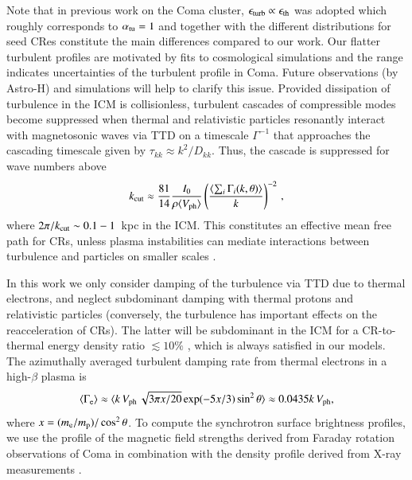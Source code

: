 \documentclass[fleqn,usenatbib,useAMS]{mnras}
\newcommand{\Vph}{V_\mathrm{ph}}
\begin{document}
Note that in previous work on the Coma cluster, $\epsilon_{\mathrm{turb}}
\propto \epsilon_{\mathrm{th}}$ was adopted which roughly corresponds to
$\alpha_{\mathrm{tu}}= 1$ \citep{brunetti12} and together with the
different distributions for seed CRes constitute the main differences
compared to our work. Our flatter turbulent profiles are motivated by
fits to cosmological simulations
\citep{2009ApJ...705.1129L,2010ApJ...725.1452S,2011A&A...529A..17V,2012ApJ...758...74B}
and the range indicates uncertainties of the turbulent profile in
Coma. Future observations (by Astro-H) and simulations will help to
clarify this issue. Provided dissipation of turbulence in the ICM is
collisionless, turbulent cascades of compressible modes become
suppressed when thermal and relativistic particles resonantly interact
with magnetosonic waves via TTD on a timescale $\Gamma^{-1}$ that
approaches the cascading timescale given by $\tau_{kk} \approx
k^2/D_{kk}$. Thus, the cascade is suppressed for wave numbers above
\begin{equation}
\label{eq:kc}
  k_\rmn{cut} \approx \frac{81}{14} \frac{I_0}{\rho \langle \Vph \rangle}
  \left(\frac{\langle\sum_i \Gamma_i(k,\theta)\rangle}{k}\right)^{-2}\,,
\end{equation}
where $2\pi/k_{\mathrm{cut}}\sim 0.1-1$~kpc in the ICM. This constitutes an
effective mean free path for CRs, unless plasma instabilities can
mediate interactions between turbulence and particles on smaller
scales \citep{brunetti11}.

In this work we only consider damping of the turbulence via TTD due to
thermal electrons, and neglect subdominant damping with thermal
protons and relativistic particles (conversely, the turbulence has
important effects on the reacceleration of CRs). The latter will be
subdominant in the ICM for a CR-to-thermal energy density ratio
$\lesssim 10 \%$ \citep{brunetti07}, which is always satisfied in our
models. The azimuthally averaged turbulent damping rate from thermal
electrons \citep{brunetti07} in a high-$\beta$ plasma is
\begin{equation}
\label{eq:Gamma_e}
\langle\Gamma_{\rmn{e}}\rangle \approx \langle k\,\Vph\,\sqrt{3\upi
  x/20}\exp(-5x/3)\sin^2{\theta}\rangle\approx 0.0435k\,\Vph, 
\end{equation}
where $x=(m_{{\mathrm{e}}}/m_{{\mathrm{p}}})/\cos^2{\theta}$. To compute the
synchrotron surface brightness profiles, we use the profile of the
magnetic field strengths derived from Faraday rotation observations of
Coma \citep{bonafede10} in combination with the density profile
derived from X-ray measurements \citep{1992A&A...259L..31B}.
\end{document}
